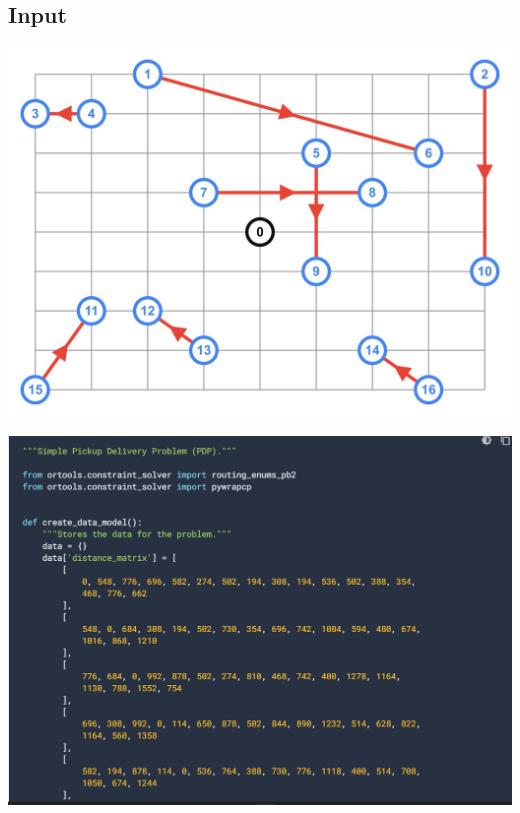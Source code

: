 \documentclass[conference]{IEEEtran}
\begin{document}
\begin{center}
    

\subsection{\textbf{Input}}    
\begin{center}
\includegraphics[width=1\linewidth]{
input.jpg}\par  
\end{center}

\begin{center}
\includegraphics[width=1\linewidth]{
1.png}\par  
\end{center}


\end{center}
\end{document}
